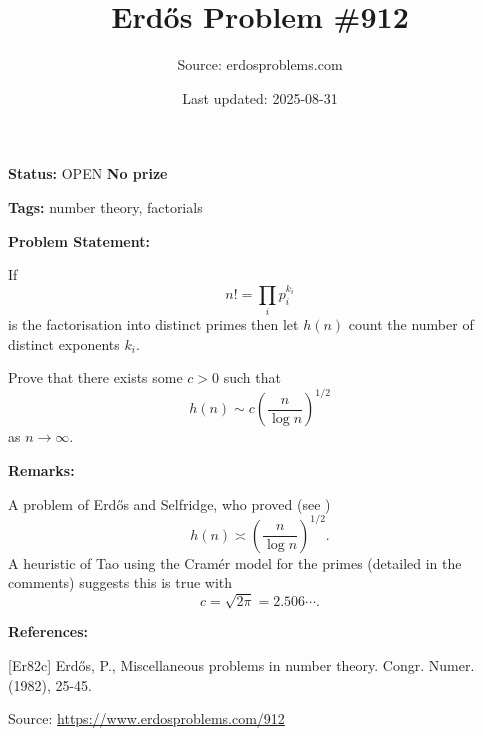 \documentclass{article}
\title{Erd\H{o}s Problem \#912}
\date{Last updated: 2025-08-31}
\author{Source: erdosproblems.com}
\begin{document}
\maketitle

\noindent\textbf{Status:} OPEN \quad \textbf{No prize}

\noindent\textbf{Tags:} number theory, factorials

\medskip
\noindent\textbf{Problem Statement:}

If\[n! = \prod_i p_i^{k_i}\]is the factorisation into distinct primes then let $h(n)$ count the number of distinct exponents $k_i$. 

Prove that there exists some $c>0$ such that\[h(n) \sim c \left(\frac{n}{\log n}\right)^{1/2}\]as $n\to \infty$.

\bigskip
\noindent\textbf{Remarks:}

A problem of Erd\H{o}s and Selfridge, who proved (see \cite{Er82c})\[h(n) \asymp \left(\frac{n}{\log n}\right)^{1/2}.\]A heuristic of Tao using the Cram\'{e}r model for the primes (detailed in the comments) suggests this is true with\[c=\sqrt{2\pi}=2.506\cdots.\]

\bigskip
\noindent\textbf{References:}

[Er82c] Erd\H{o}s, P., Miscellaneous problems in number theory. Congr. Numer. (1982), 25-45.

\bigskip
\noindent\small{Source: \url{https://www.erdosproblems.com/912}}
\end{document}
